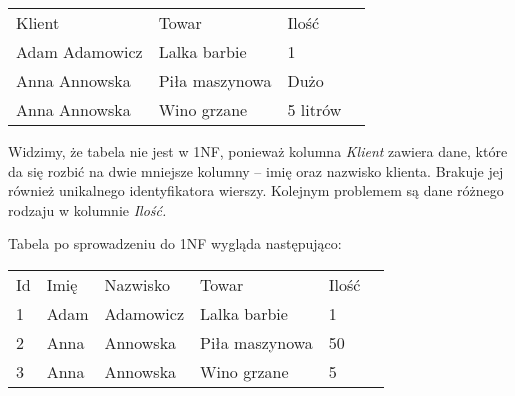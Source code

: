 \begin{table}[H]
\centering
\begin{tabular}{|l|l|l|l}
\cline{1-3}
Klient         & Towar          & Ilość    &  \\ \cline{1-3}
Adam Adamowicz & Lalka barbie   & 1        &  \\ \cline{1-3}
Anna Annowska  & Piła maszynowa & Dużo     &  \\ \cline{1-3}
Anna Annowska  & Wino grzane    & 5 litrów &  \\ \cline{1-3}
\end{tabular}
\end{table}

Widzimy, że tabela nie jest w 1NF, ponieważ kolumna \textit{Klient} zawiera dane, które da się rozbić na dwie mniejsze kolumny -- imię oraz nazwisko klienta.
Brakuje jej również unikalnego identyfikatora wierszy.
Kolejnym problemem są dane różnego rodzaju w kolumnie \textit{Ilość.} 

Tabela po sprowadzeniu do 1NF wygląda następująco:
\begin{table}[H]
\centering
\begin{tabular}{|l|l|l|l|l|l}
\cline{1-5}
Id & Imię & Nazwisko  & Towar          & Ilość &  \\ \cline{1-5}
1  & Adam & Adamowicz & Lalka barbie   & 1     &  \\ \cline{1-5}
2  & Anna & Annowska  & Piła maszynowa & 50    &  \\ \cline{1-5}
3  & Anna & Annowska  & Wino grzane    & 5     &  \\ \cline{1-5}
\end{tabular}
\end{table}